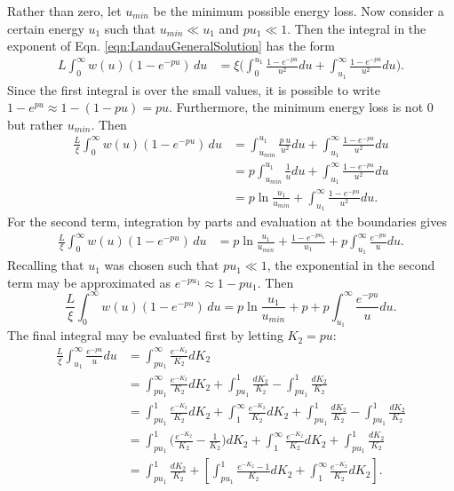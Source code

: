 Rather than zero, let $u_{min}$ be the minimum possible energy loss. Now consider a certain energy $u_1$ such that $u_{min}\ll u_1$ and $pu_1 \ll 1$. Then the integral in the exponent of Eqn. \ref{eqn:LandauGeneralSolution} has the form
\begin{align*}
L\int_0 ^\infty w(u)  (1-e^{-pu})\, du &= \xi\Big( \int_0 ^{u_1} \frac{1-e^{-pu}}{u^2} du + \int_{u_1} ^\infty \frac{1-e^{-pu}}{u^2} du\Big) .
\end{align*}
Since the first integral is over the small values, it is possible to write $1-e^{pu} \approx 1-(1-pu) = pu$. Furthermore, the minimum energy loss is not 0 but rather $u_{min}$. Then
\begin{align*}
\frac{L}{\xi}\int_0 ^\infty w(u)  (1-e^{-pu})\, du &=\int_{u_{min}} ^{u_1} \frac{p\ u}{u^2} du + \int_{u_1} ^\infty \frac{1-e^{-pu}}{u^2} du\\
&=p\int_{u_{min}} ^{u_1} \frac{1}{u} du + \int_{u_1} ^\infty \frac{1-e^{-pu}}{u^2} du\\
&=p \ln\frac{u_1}{u_{min}} + \int_{u_1} ^\infty \frac{1-e^{-pu}}{u^2} du.
\end{align*}
For the second term, integration by parts and evaluation at the boundaries gives
\begin{align*}
\frac{L}{\xi}\int_0 ^\infty w(u)  (1-e^{-pu})\, du &=p \ln\frac{u_1}{u_{min}} + \frac{1-e^{-pu_1}}{u_1}+p\int_{u_1}^\infty \frac{e^{-pu}}{u} du.
\end{align*}
Recalling that $u_1$ was chosen such that $pu_1 \ll 1$, the exponential in the second term may be approximated as $e^{-pu_1}\approx 1-pu_1$. Then
\begin{equation} \label{eqn:landauIntermediate1}
\frac{L}{\xi}\int_0 ^\infty w(u)  (1-e^{-pu})\, du =p \ln\frac{u_1}{u_{min}} + p+p\int_{u_1}^\infty \frac{e^{-pu}}{u} du.
\end{equation}
The final integral may be evaluated first by letting $K_2=pu$:
\begin{align*}
\frac{L}{\xi}\int_{u_1}^\infty \frac{e^{-pu}}{u} du &= \int _{pu_1} ^\infty \frac{e^{-K_2}}{K_2}dK_2\\
&= \int_{pu_1} ^\infty \frac{e^{-K_2}}{K_2} dK_2 + \int_{pu_1} ^1 \frac{dK_2}{K_2} - \int_{pu_1} ^1 \frac{dK_2}{K_2} \\
&= \int_{pu_1} ^1 \frac{e^{-K_2}}{K_2} dK_2 + \int_1 ^\infty \frac{e^{-K_2}}{K_2} dK_2 + \int_{pu_1} ^1 \frac{dK_2}{K_2} - \int_{pu_1} ^1 \frac{dK_2}{K_2} \\
&= \int_{pu_1} ^1 \Big(\frac{e^{-K_2}}{K_2}-\frac{1}{K_2}\Big) dK_2 + \int_1 ^\infty \frac{e^{-K_2}}{K_2} dK_2 + \int_{pu_1} ^1 \frac{dK_2}{K_2} \\
&= \int_{pu_1} ^1 \frac{dK_2}{K_2} + \left[\int_{pu_1} ^1 \frac{e^{-K_2}-1}{K_2} dK_2 + \int_1 ^\infty \frac{e^{-K_2}}{K_2} dK_2 \right].
\end{align*}
